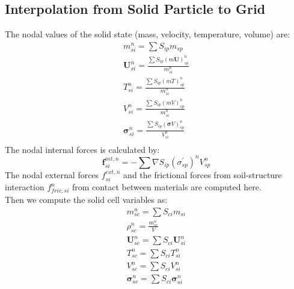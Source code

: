 \documentclass[preprint,12pt]{elsarticle}
\begin{document}
\subsection{\textsf{Interpolation from Solid Particle to Grid}}
%
%
The nodal values of the solid state (mass, velocity, temperature, volume) are:
%
%
\begin{equation}
\begin{gathered}
     m_{si}^n = \sum{S_{ip}m_{sp}}\\
     \pmb{U}_{si}^n = \frac {\sum{S_{ip} (m\pmb{U})_{sp}^n}}{m_{si}^n}\\
     T_{si}^n = \frac {\sum{S_{ip} (mT)_{sp}^n}}{m_{si}^n}\\
     V_{si}^n = \frac {\sum{S_{ip} (mV)_{sp}^n}}{m_{si}^n}\\
     \pmb{\sigma}_{si}^n = \frac {\sum{S_{ip} (\pmb{\sigma}V)_{sp}^n}}{V_{si}^n}\\
\end {gathered}
\end {equation}
%
%
The nodal internal forces is calculated by:
%
%
\begin{equation}
     \pmb{f}_{si}^{int,n} = -\sum{\nabla S_{ip} (\sigma_{sp}^\prime)^n V_{sp}^n}
\end {equation}
%
%
The nodal external forces $f_{si}^{ext,n}$ and the frictional forces from soil-structure interaction $f_{fric,si}^{n}$ from contact between materials are computed here.\\
Then we compute the solid cell variables as:
%
%
\begin{equation}
\begin{gathered}
     m_{sc}^n = \sum{S_{ci}m_{si}}\\
   \rho_{sc}^n = \frac{m_{sc}^n}{V}\\  
     \pmb{U}_{sc}^n = \sum{S_{ci} \pmb{U}_{si}^n}\\
     T_{sc}^n = \sum{S_{ci} T_{si}^n}\\
     V_{sc}^n = \sum{S_{ci} V_{si}^n}\\
     \pmb{\sigma}_{sc}^n = \sum{S_{ci} \pmb{\sigma}_{si}^n}\\
\end {gathered}
\end {equation}
%
%
\end{document}

